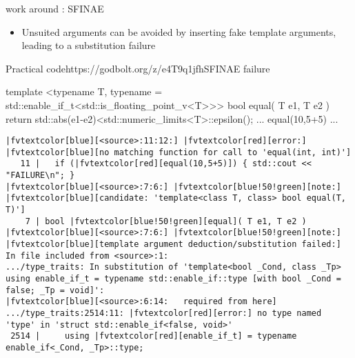 \begin{frame}[fragile]
  \begin{block}{ work around : SFINAE}
    \begin{itemize}
    \item Unsuited arguments can be avoided by inserting fake template arguments,
    leading to a substitution failure
    \end{itemize}
  \end{block}
  \begin{exampleblockGB}{Practical code}{https://godbolt.org/z/e4T9q1jfh}{SFINAE failure}
    \scriptsize
    \begin{cppcode*}{}
    template
    <typename T,
     typename = std::enable_if_t<std::is_floating_point_v<T>>>
    bool equal( T e1, T e2 ) {
      return std::abs(e1-e2)<std::numeric_limits<T>::epsilon();
    }
    ... equal(10,5+5) ...
    \end{cppcode*}
    \pause
    \tiny
    \begin{Verbatim}[commandchars=\|\[\]]
|fvtextcolor[blue][<source>:11:12:] |fvtextcolor[red][error:] |fvtextcolor[blue][no matching function for call to 'equal(int, int)']
   11 |   if (|fvtextcolor[red][equal(10,5+5)]) { std::cout << "FAILURE\n"; }
|fvtextcolor[blue][<source>:7:6:] |fvtextcolor[blue!50!green][note:] |fvtextcolor[blue][candidate: 'template<class T, class> bool equal(T, T)']
    7 | bool |fvtextcolor[blue!50!green][equal]( T e1, T e2 )
|fvtextcolor[blue][<source>:7:6:] |fvtextcolor[blue!50!green][note:]   |fvtextcolor[blue][template argument deduction/substitution failed:]
In file included from <source>:1:
.../type_traits: In substitution of 'template<bool _Cond, class _Tp>
using enable_if_t = typename std::enable_if::type [with bool _Cond = false; _Tp = void]':
|fvtextcolor[blue][<source>:6:14:   required from here]
.../type_traits:2514:11: |fvtextcolor[red][error:] no type named 'type' in 'struct std::enable_if<false, void>'
 2514 |     using |fvtextcolor[red][enable_if_t] = typename enable_if<_Cond, _Tp>::type;
    \end{Verbatim}
  \end{exampleblockGB}
\end{frame}

